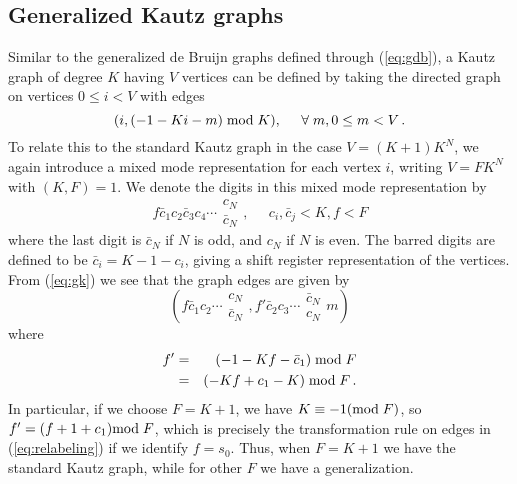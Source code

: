 \documentclass[12pt]{article}
\begin{document}
\subsection{Generalized Kautz graphs}

Similar to the generalized de Bruijn graphs defined through
(\ref{eq:gdb}), a Kautz graph of degree $K$ having $V$ vertices can be
defined by taking the directed graph on vertices $0 \leq i < V$ with
edges
\begin{equation}
(i, (-1 - Ki - m) \; {\rm mod} \; K), \;\;\;\;\; \forall \;m,0 \leq m < V \,.
\label{eq:gk}
\end{equation}
To relate this to the standard Kautz graph in the case $V = (K +
1)K^N$, we again introduce a mixed mode representation for each vertex
$i$, writing $V = FK^N$ with $(K, F) = 1$.  We denote the digits in
this mixed mode representation by
\begin{equation}
f \bar{c}_1 c_2 \bar{c}_3c_4 \cdots \begin{array}{c}
c_N \\ \bar{c}_N
\end{array}, \;\;\;\;\; c_i, \bar{c}_j
 < K, f < F
\label{eq:gk-mixed}
\end{equation}
where the last digit is $\bar{c}_N$ if $N$ is odd, and $c_N$ if $N$ is
even.
The barred digits are defined to be $\bar{c}_i = K -1 -c_i$, giving a
shift register representation of the vertices.  From (\ref{eq:gk}) we
see that the graph edges are given by
\begin{equation}
(f \bar{c}_1 c_2 \cdots \begin{array}{c}
c_N \\ \bar{c}_N
\end{array}, f' \bar{c}_2  {c}_3 \cdots \begin{array}{c}
\bar{c}_N \\ {c}_N
\end{array} m)
\end{equation}
where
\begin{eqnarray}
f'  & = &  (-1 - Kf - \bar{c}_1) \; {\rm mod} \; F \\
 & = &  (- Kf + c_1 -K) \; {\rm mod} \; F \,.
\end{eqnarray}
In particular, if we choose $F = K + 1$, we have $K \equiv -1 ({\rm
 mod} \; F)$, so $f' =  (f + 1 + c_1) {\rm mod} \;F$, which is precisely
the transformation rule on edges in (\ref{eq:relabeling}) if we
 identify $f = s_0$.  Thus, when $F = K + 1$ we have the standard
 Kautz graph, while for other $F$ we have a generalization.
\end{document}
